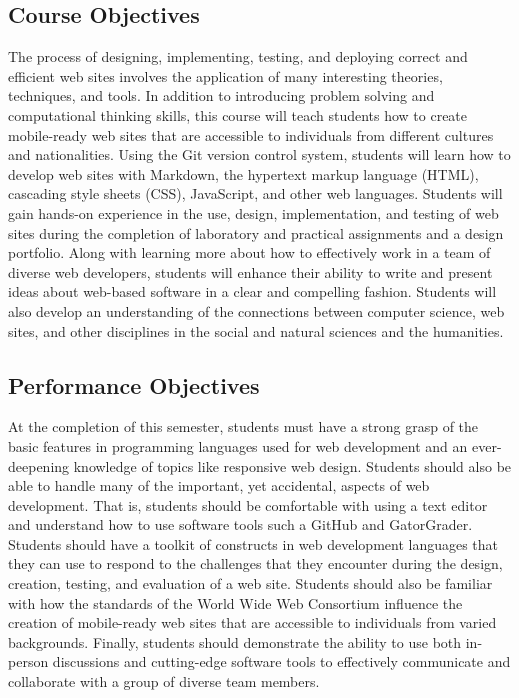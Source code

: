 \documentclass[11pt]{article}
\begin{document}
\subsection*{Course Objectives}

The process of designing, implementing, testing, and deploying correct and
efficient web sites involves the application of many interesting theories,
techniques, and tools. In addition to introducing problem solving and
computational thinking skills, this course will teach students how to create
mobile-ready web sites that are accessible to individuals from different
cultures and nationalities. Using the Git version control system, students will
learn how to develop web sites with Markdown, the hypertext markup language
(HTML), cascading style sheets (CSS), JavaScript, and other web languages.
%
Students will gain hands-on experience in the use, design, implementation, and
testing of web sites during the completion of laboratory and practical
assignments and a design portfolio. Along with learning more about how to
effectively work in a team of diverse web developers, students will enhance
their ability to write and present ideas about web-based software in a clear
and compelling fashion. Students will also develop an understanding of the
connections between computer science, web sites, and other disciplines in the
social and natural sciences and the humanities.

\subsection*{Performance Objectives}

At the completion of this semester, students must have a strong grasp of the
basic features in programming languages used for web development and an
ever-deepening knowledge of topics like responsive web design. Students should
also be able to handle many of the important, yet accidental, aspects of web
development. That is, students should be comfortable with using a text editor
and understand how to use software tools such a GitHub and GatorGrader.
Students should have a toolkit of constructs in web development languages that
they can use to respond to the challenges that they encounter during the
design, creation, testing, and evaluation of a web site. Students should also
be familiar with how the standards of the World Wide Web Consortium influence
the creation of mobile-ready web sites that are accessible to individuals from
varied backgrounds. Finally, students should demonstrate the ability to use
both in-person discussions and cutting-edge software tools to effectively
communicate and collaborate with a group of diverse team members.
\end{document}
